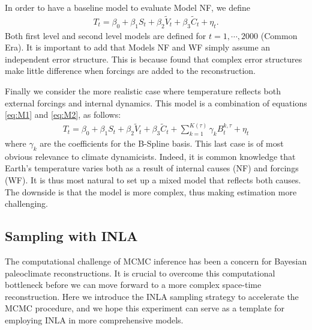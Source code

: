 \documentclass[12pt]{amsart}
\theoremstyle{plain}
\theoremstyle{definition}
\theoremstyle{remark}
\newcommand{\lb}[1]{\color{MidnightBlue}\textbf{[LB: #1]}\normalcolor}
\newcommand{\jeg}[1]{\color{ProcessBlue}\textbf{[JEG: #1]}\normalcolor}
\begin{document}
In order to have a baseline model to evaluate Model NF, we
define
  \begin{align}\label{eq:M2}
    T_t=\beta_0+\beta_1S_t+\beta_2\tilde V_t+\beta_3\tilde C_t+\eta_t.
  \end{align}
Both first level and second level models are defined for
$t=1,\cdots,2000$ (Common Era). It is important to add that Models NF and WF simply assume an independent error structure. This is because \cite{Barboza2014} 
found that complex error structures make little difference when forcings are added to the reconstruction.

Finally we consider the more realistic case where temperature reflects both external forcings and internal dynamics. This model is a combination of equations \eqref{eq:M1} and \eqref{eq:M2}, as follows:
  \begin{align}\label{eq:M3}
    T_t=\beta_0+\beta_1S_t+\beta_2\tilde V_t+\beta_3\tilde C_t+\sum_{k=1}^{K(\tau)}\gamma_k B_t^{k,\tau}+\eta_t
  \end{align}
  where $\gamma_k$ are the coefficients for the B-Spline basis. %
  This last case is of most obvious relevance to climate dynamicists. Indeed, it is common knowledge that Earth's temperature varies both as a result of internal causes (NF) and forcings (WF). It is thus most natural to set up a mixed model that reflects both causes. The downside is that the model is more complex, thus making estimation more challenging. 



\subsection{Sampling with INLA}

The computational challenge of MCMC inference has been a concern for Bayesian paleoclimate reconstructions. It is crucial to overcome this computational bottleneck before we can move forward to a more complex space-time reconstruction. Here we introduce the INLA sampling strategy to accelerate the MCMC procedure, and we hope this experiment can serve as a template for employing INLA in more comprehensive models. 

\end{document}
